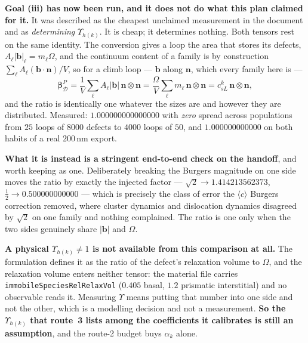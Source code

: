 \documentclass{article}
\newcommand{\cloop}{\ensuremath{\langle c\rangle}}
\newcommand{\bvec}{\bm b}
\newcommand{\nvec}{\bm n}
\newcommand{\code}[1]{\texttt{#1}}
\begin{document}
\textbf{Goal (iii) has now been run, and it does not do what this plan claimed
for it.} It was described as the cheapest unclaimed measurement in the document
and as \emph{determining} $\Upsilon_{h(k)}$. It is cheap; it determines nothing.
Both tensors rest on the same identity. The conversion gives a loop the area
that stores its defects, $A_\ell|\bvec|_\ell=m_\ell\Omega$, and the continuum
content of a family is by construction $\sum_\ell A_\ell(\bvec\!\cdot\!\nvec)/V$,
so for a climb loop --- $\bvec$ along $\nvec$, which every family here is ---
\[
  \bm\beta^{P}_{\mathcal D}
   =\frac1V\sum_\ell A_\ell|\bvec|\,\nvec\otimes\nvec
   =\frac{\Omega}{V}\sum_\ell m_\ell\,\nvec\otimes\nvec
   =c^k_{sL}\,\nvec\otimes\nvec ,
\]
and the ratio is identically one whatever the sizes are and however they are
distributed. Measured: $1.000000000000000$ with \emph{zero} spread across
populations from $25$ loops of $8000$ defects to $4000$ loops of $50$, and
$1.000000000000$ on both habits of a real $200$\,nm export.

\textbf{What it is instead is a stringent end-to-end check on the handoff}, and
worth keeping as one. Deliberately breaking the Burgers magnitude on one side
moves the ratio by exactly the injected factor --- $\sqrt2\to1.414213562373$,
$\tfrac12\to0.500000000000$ --- which is precisely the class of error the
\cloop{} Burgers correction removed, where cluster dynamics and dislocation
dynamics disagreed by $\sqrt2$ on one family and nothing complained. The ratio
is one only when the two sides genuinely share $|\bvec|$ and $\Omega$.

\textbf{A physical $\Upsilon_{h(k)}\ne1$ is not available from this comparison
at all.} The formulation defines it as the ratio of the defect's relaxation
volume to $\Omega$, and the relaxation volume enters neither tensor: the
material file carries \code{immobileSpeciesRelRelaxVol} ($0.405$ basal, $1.2$
prismatic interstitial) and no observable reads it. Measuring $\Upsilon$ means
putting that number into one side and not the other, which is a modelling
decision and not a measurement. \textbf{So the $\Upsilon_{h(k)}$ that route~3
lists among the coefficients it calibrates is still an assumption}, and the
route-2 budget buys $\alpha_k$ alone.
\end{document}
